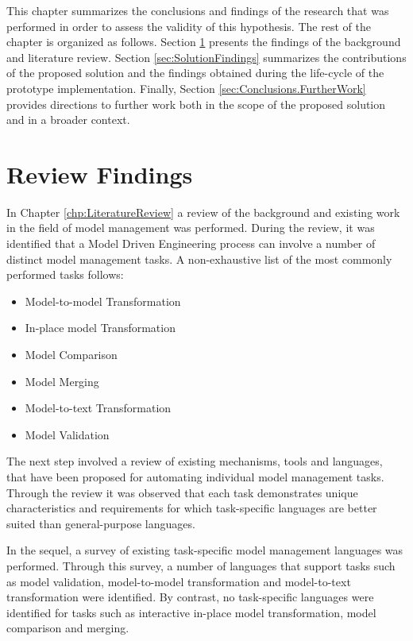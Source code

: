This chapter summarizes the conclusions and findings of the research that was performed in order to assess the validity of this hypothesis. The rest of the chapter is organized as follows. Section \ref{sec:ReviewFindings} presents the findings of the background and literature review. Section \ref{sec:SolutionFindings} summarizes the contributions of the proposed solution and the findings obtained during the life-cycle of the prototype implementation. Finally, Section \ref{sec:Conclusions.FurtherWork} provides directions to further work both in the scope of the proposed solution and in a broader context.

\section{Review Findings}
\label{sec:ReviewFindings}

In Chapter \ref{chp:LiteratureReview} a review of the background and existing work in the field of model management was performed. During the review, it was identified that a Model Driven Engineering process can involve a number of distinct model management tasks. A non-exhaustive list of the most commonly performed tasks follows:

\begin{itemize}
	\item Model-to-model Transformation
	\item In-place model Transformation
	\item Model Comparison
	\item Model Merging
	\item Model-to-text Transformation
	\item Model Validation
\end{itemize}

The next step involved a review of existing mechanisms, tools and languages, that have been proposed for automating individual model management tasks. Through the review it was observed that each task demonstrates unique characteristics and requirements for which task-specific languages are better suited than general-purpose languages.

In the sequel, a survey of existing task-specific model management languages was performed. Through this survey, a number of languages that support tasks such as model validation, model-to-model transformation and model-to-text transformation were identified. By contrast, no task-specific languages were identified for tasks such as interactive in-place model transformation, model comparison and merging.

